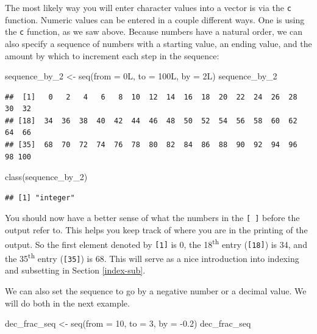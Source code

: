 \documentclass[]{tufte-book}
\newenvironment{Shaded}{\begin{snugshade}}{\end{snugshade}}
\newcommand{\AttributeTok}[1]{\textcolor[rgb]{0.77,0.63,0.00}{#1}}
\newcommand{\DecValTok}[1]{\textcolor[rgb]{0.00,0.00,0.81}{#1}}
\newcommand{\FloatTok}[1]{\textcolor[rgb]{0.00,0.00,0.81}{#1}}
\newcommand{\FunctionTok}[1]{\textcolor[rgb]{0.00,0.00,0.00}{#1}}
\newcommand{\NormalTok}[1]{#1}
\newcommand{\OtherTok}[1]{\textcolor[rgb]{0.56,0.35,0.01}{#1}}
\newcommand{\SpecialCharTok}[1]{\textcolor[rgb]{0.00,0.00,0.00}{#1}}
\begin{document}
The most likely way you will enter character values into a vector is via the \texttt{c} function. Numeric values can be entered in a couple different ways. One is using the \texttt{c} function, as we saw above. Because numbers have a natural order, we can also specify a sequence of numbers with a starting value, an ending value, and the amount by which to increment each step in the sequence:

\begin{Shaded}
\begin{Highlighting}[]
\NormalTok{sequence\_by\_2 }\OtherTok{\textless{}{-}} \FunctionTok{seq}\NormalTok{(}\AttributeTok{from =}\NormalTok{ 0L, }\AttributeTok{to =}\NormalTok{ 100L, }\AttributeTok{by =}\NormalTok{ 2L)}
\NormalTok{sequence\_by\_2}
\end{Highlighting}
\end{Shaded}

\begin{verbatim}
##  [1]   0   2   4   6   8  10  12  14  16  18  20  22  24  26  28  30  32
## [18]  34  36  38  40  42  44  46  48  50  52  54  56  58  60  62  64  66
## [35]  68  70  72  74  76  78  80  82  84  86  88  90  92  94  96  98 100
\end{verbatim}

\begin{Shaded}
\begin{Highlighting}[]
\FunctionTok{class}\NormalTok{(sequence\_by\_2)}
\end{Highlighting}
\end{Shaded}

\begin{verbatim}
## [1] "integer"
\end{verbatim}

You should now have a better sense of what the numbers in the \texttt{{[}\ {]}} before the output refer to. This helps you keep track of where you are in the printing of the output. So the first element denoted by \texttt{{[}1{]}} is 0, the 18\textsuperscript{th} entry (\texttt{{[}18{]}}) is 34, and the 35\textsuperscript{th} entry (\texttt{{[}35{]}}) is 68. This will serve as a nice introduction into indexing and subsetting in Section \ref{index-sub}.

We can also set the sequence to go by a negative number or a decimal value. We will do both in the next example.

\begin{Shaded}
\begin{Highlighting}[]
\NormalTok{dec\_frac\_seq }\OtherTok{\textless{}{-}} \FunctionTok{seq}\NormalTok{(}\AttributeTok{from =} \DecValTok{10}\NormalTok{, }\AttributeTok{to =} \DecValTok{3}\NormalTok{, }\AttributeTok{by =} \SpecialCharTok{{-}}\FloatTok{0.2}\NormalTok{)}
\NormalTok{dec\_frac\_seq}
\end{Highlighting}
\end{Shaded}
\end{document}

